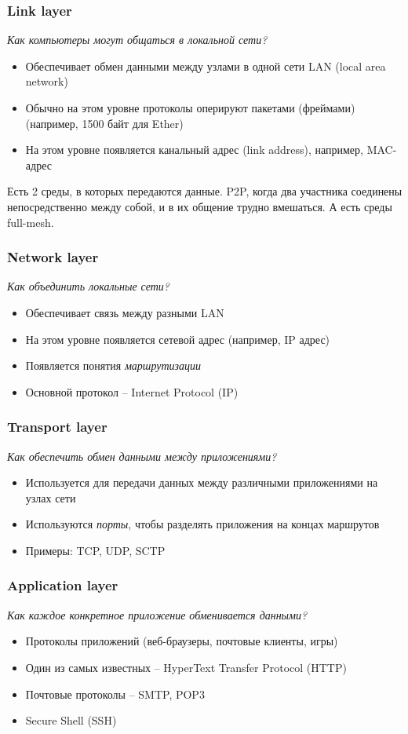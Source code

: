   \subsubsection{Link layer}
    \textit{Как компьютеры могут общаться в локальной сети?}
    \begin{itemize}
      \item Обеспечивает обмен данными между узлами в одной сети LAN (local area network)
      \item Обычно на этом уровне протоколы оперируют пакетами (фреймами) (например, 1500 байт для Ether)
      \item На этом уровне появляется канальный адрес (link address), например, MAC-адрес
    \end{itemize}
    Есть 2 среды, в которых передаются данные. P2P, когда два участника соединены непосредственно между собой, и в их общение трудно вмешаться. А есть среды full-mesh.
  
  \subsubsection{Network layer}
    \textit{Как объединить локальные сети?}
    \begin{itemize}
      \item Обеспечивает связь между разными LAN
      \item На этом уровне появляется сетевой адрес (например, IP адрес)
      \item Появляется понятия \textit{маршрутизации}
      \item Основной протокол -- Internet Protocol (IP)
    \end{itemize}
  
  \subsubsection{Transport layer}
    \textit{Как обеспечить обмен данными между приложениями?}
    \begin{itemize}
      \item Используется для передачи данных между различными приложениями на узлах сети
      \item Используются \textit{порты}, чтобы разделять приложения на концах маршрутов
      \item Примеры: TCP, UDP, SCTP
    \end{itemize}
  
  \subsubsection{Application layer}
    \textit{Как каждое конкретное приложение обменивается данными?}
    \begin{itemize}
      \item Протоколы приложений (веб-браузеры, почтовые клиенты, игры)
      \item Один из самых известных -- HyperText Transfer Protocol (HTTP)
      \item Почтовые протоколы -- SMTP, POP3
      \item Secure Shell (SSH)
    \end{itemize}
  
